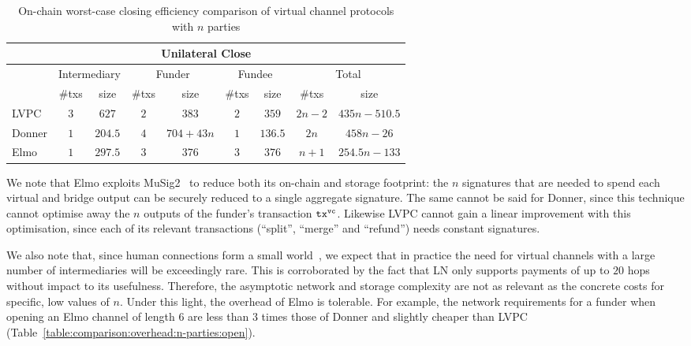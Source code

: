   \begin{table}[h!]
    \begin{minipage}{\textwidth}
    \centering
    \begin{tabular}{|l|c|c|c|c|c|c|c|c|}
    \hline
    \multicolumn{9}{|c|}{Unilateral Close} \\
    \hline
              & \multicolumn{2}{|c|}{Intermediary}
              & \multicolumn{2}{|c|}{Funder} & \multicolumn{2}{|c|}{Fundee}
              & \multicolumn{2}{|c|}{Total} \\
    \hline
              & \#txs & size & \#txs & size & \#txs & size & \#txs & size \\
    \hline
    LVPC      & $3$ & $627$ & $2$ & $383$ & $2$ & $359$ & $2n-2$ & $435n -
              510.5$ \\
    \hline
    Donner    & $1$ & $204.5$ & $4$ & $704 + 43n$ & $1$ & $136.5$ & $2n$ & $458n
              - 26$ \\
    \hline
    Elmo      & $1$ & $297.5$ & $3$ & $376$ & $3$ & $376$
              & $n+1$ & $254.5n-133$ \\
    \hline
    \end{tabular}
    \end{minipage}
    \caption{On-chain worst-case closing efficiency comparison of virtual
    channel protocols with $n$ parties}
    \label{table:comparison:overhead:n-parties:close}
  \end{table}

  We note that Elmo exploits
  MuSig2~\cite{DBLP:journals/dcc/MaxwellPSW19,DBLP:conf/crypto/NickRS21} to
  reduce both its
  on-chain and storage footprint: the $n$ signatures that are needed to spend
  each virtual and bridge output can be securely reduced to a single aggregate
  signature. The same cannot be said for
  Donner, since this technique cannot optimise away the $n$ outputs of the
  funder's transaction $\texttt{tx}^{\mathtt{vc}}$. Likewise LVPC cannot gain a linear
  improvement with this optimisation, since each of its relevant transactions
  (``split'', ``merge'' and ``refund'') needs constant signatures.

  We also note that, since human connections form a
  small world~\cite{smallworld}, we expect that in practice the
  need for virtual channels with a large number of
  intermediaries will be exceedingly rare. This is corroborated by
  the fact that LN only supports payments of up to $20$ hops
  without impact to its usefulness. Therefore, the asymptotic
  network and storage complexity are not as relevant as the
  concrete costs for specific, low values of $n$. Under this
  light, the overhead of Elmo is tolerable. For example, the
  network requirements for a funder when opening an Elmo channel
  of length $6$ are less than $3$ times those of Donner and
  slightly cheaper than LVPC
  (Table~\ref{table:comparison:overhead:n-parties:open}).

